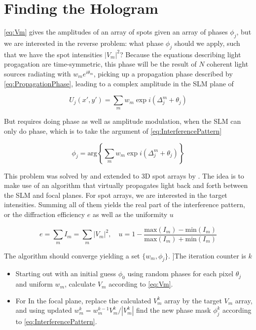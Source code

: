 \section{Finding the Hologram}\label{sec:GSW}

\cref{eq:Vm} gives the amplitudes of an array of spots given an array of phases $\phi_j$, but we are interested in the reverse problem: what phase $\phi_j$ should we apply, such that we have the spot intensities $|V_m|^2$? 
Because the equations describing light progagation are time-symmetric, this phase will be the result of $N$ coherent light sources radiating with $w_m e^{i \theta_m}$, picking up a propagation phase described by \cref{eq:PropagationPhase}, leading to a complex amplitude in the \ac{SLM} plane of 

\begin{equation}\label{eq:InterferencePattern}
    U_j (x',y') = \sum_m w_m \exp{
    i\left(\Delta_j^m + \theta_j\right)
    }
\end{equation}

But requires doing phase as well as amplitude modulation, when the SLM can only do phase, which is to take the argument of \cref{eq:InterferencePattern}

\begin{equation}\label{eq:Argument}
    \phi_j = \text{arg}\left\{
     \sum_m w_m \exp{
    i\left(\Delta_j^m + \theta_j\right)
    }
    \right\}
\end{equation}

This problem was solved by \cite{Gerschberg1972} and extended to 3D spot arrays by \cite{DiLeonardo2007}. 
The idea is to make use of an algorithm that virtually propagates light back and forth between the SLM and focal planes.
For spot arrays, we are interested in the target intensities.
Summing all of them yields the real part of the interference pattern, or the diffraction efficiency $e$ as well as the uniformity $u$

\begin{equation}
    e = \sum_m I_m = \sum_m |V_m|^2, 
    \quad 
    u = 1-\frac{\text{max}(I_m)-\text{min}(I_m)}{\text{max}(I_m)+\text{min}(I_m)}
\end{equation}

The algorithm should converge yielding a set $\{w_m, \phi_j\}$. 
]The iteration counter is $k$

\begin{itemize}
    \item Starting out with an initial guess $\phi_0$ using random phases for each pixel $\theta_j$ and uniform $w_m$, calculate $V_m$ according to \cref{eq:Vm}. 
    
    \item For In the focal plane, replace the calculated $V_m^k$ array by the target $V_m$ array, and using updated $w_m^k = w_m^{k-1} V_m^k / |V_m^k|$ find the new phase mask $\phi_j^k$ according to \cref{eq:InterferencePattern}.
\end{itemize}

